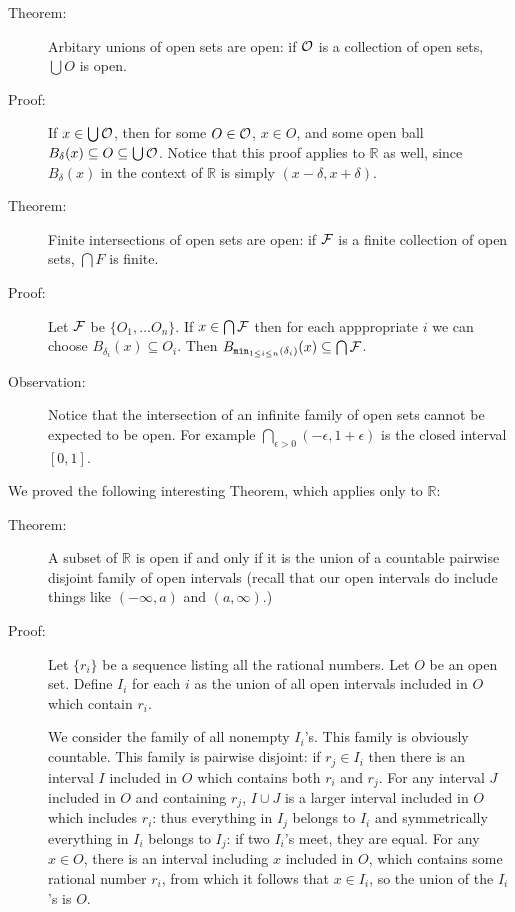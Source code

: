 \documentclass[12pt]{article}
\begin{document}
\begin {description}

\item[Theorem:]  Arbitary unions of open sets are open:  if $\cal O$ is a collection of open sets, $\bigcup O$ is open.

\item[Proof:]  If $x \in \bigcup \cal O$, then for some $O \in \cal O$, $x \in O$, and some open ball $B_\delta(x) \subseteq O \subseteq \bigcup\cal O$.  Notice that this proof applies to $\mathbb R$ as well, since $B_\delta(x)$ in the context of $\mathbb R$ is simply $(x - \delta,x+\delta)$.

\item[Theorem:]  Finite intersections of open sets are open:  if $\cal F$ is a finite collection of open sets, $\bigcap F$ is finite.

\item[Proof:]  Let $\cal F$ be $\{O_1,\ldots O_n\}$.  If $x \in \bigcap \cal F$ then for each apppropriate $i$ we can choose $B_{\delta_i}(x) \subseteq O_i$.  Then
$B_{{\tt min}_{1 \leq i \leq n}(\delta_i)}(x) \subseteq \bigcap \cal F$.

\item[Observation:]  Notice that the intersection of an infinite family of open sets cannot be expected to be open.  For example $\bigcap_{\epsilon>0}(-\epsilon,1+\epsilon)$ is the closed interval $[0,1]$.

\end{description}

We proved the following interesting Theorem, which applies only to $\mathbb R$:

\begin{description}

\item[Theorem:]  A subset of $\mathbb R$ is open if and only if it is the union of a countable pairwise disjoint family of open intervals (recall that our open intervals do include
things like $(-\infty,a)$ and $(a,\infty)$.)

\item[Proof:]  Let $\{r_i\}$ be a sequence listing all the rational numbers.  Let $O$ be an open set.  Define $I_i$ for each $i$ as the union of all open intervals included in $O$ which contain $r_i$.

We consider the family of all nonempty $I_i$'s.  This family is obviously countable.  This family is pairwise disjoint:  if $r_j \in I_i$ then there is an interval $I$ included in $O$ which contains both $r_i$ and $r_j$.  For any interval $J$ included in $O$ and containing $r_j$,
$I \cup J$ is a larger interval included in $O$ which includes $r_i$:  thus everything in $I_j$ belongs to $I_i$ and symmetrically everything in $I_i$ belongs to $I_j$:  if two $I_i$'s meet, they are equal.  For any $x \in O$, there is an interval including $x$ included in $O$, which contains some rational number $r_i$, from which it follows that $x \in I_i$, so the union of the $I_i$'s is $O$.

\end{description}
\end{document}
